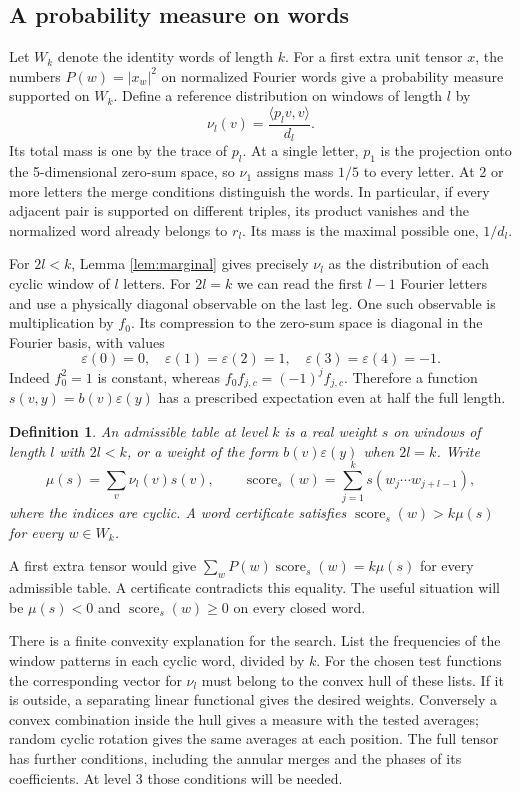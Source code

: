 \documentclass[11pt,a4paper]{amsart}
\newtheorem{definition}[theorem]{Definition}
\newcommand{\score}{\operatorname{score}}
\begin{document}
\subsection{A probability measure on words}
Let $W_k$ denote the identity words of length $k$. For a first extra unit tensor $x$, the numbers $P(w)=|x_w|^2$ on normalized Fourier words give a probability measure supported on $W_k$. Define a reference distribution on windows of length $l$ by
\[
 \nu_l(v)=\frac{\langle p_lv,v\rangle}{d_l}.
\]
Its total mass is one by the trace of $p_l$. At a single letter, $p_1$ is the projection onto the 5-dimensional zero-sum space, so $\nu_1$ assigns mass $1/5$ to every letter. At 2 or more letters the merge conditions distinguish the words. In particular, if every adjacent pair is supported on different triples, its product vanishes and the normalized word already belongs to $r_l$. Its mass is the maximal possible one, $1/d_l$.

For $2l<k$, Lemma \ref{lem:marginal} gives precisely $\nu_l$ as the distribution of each cyclic window of $l$ letters. For $2l=k$ we can read the first $l-1$ Fourier letters and use a physically diagonal observable on the last leg. One such observable is multiplication by $f_0$. Its compression to the zero-sum space is diagonal in the Fourier basis, with values
\[
 \varepsilon(0)=0,\quad \varepsilon(1)=\varepsilon(2)=1,\quad
 \varepsilon(3)=\varepsilon(4)=-1.
\]
Indeed $f_0^2=1$ is constant, whereas $f_0 f_{j,c}=(-1)^j f_{j,c}$. Therefore a function $s(v,y)=b(v)\varepsilon(y)$ has a prescribed expectation even at half the full length.

\begin{definition}
An admissible table at level $k$ is a real weight $s$ on windows of length $l$ with $2l<k$, or a weight of the form $b(v)\varepsilon(y)$ when $2l=k$. Write
\[
 \mu(s)=\sum_v\nu_l(v)s(v),\qquad
 \score_s(w)=\sum_{j=1}^k s(w_j\cdots w_{j+l-1}),
\]
where the indices are cyclic. A word certificate satisfies $\score_s(w)>k\mu(s)$ for every $w\in W_k$.
\end{definition}
A first extra tensor would give $\sum_w P(w)\score_s(w)=k\mu(s)$ for every admissible table. A certificate contradicts this equality. The useful situation will be $\mu(s)<0$ and $\score_s(w)\geq0$ on every closed word.

There is a finite convexity explanation for the search. List the frequencies of the window patterns in each cyclic word, divided by $k$. For the chosen test functions the corresponding vector for $\nu_l$ must belong to the convex hull of these lists. If it is outside, a separating linear functional gives the desired weights. Conversely a convex combination inside the hull gives a measure with the tested averages; random cyclic rotation gives the same averages at each position. The full tensor has further conditions, including the annular merges and the phases of its coefficients. At level 3 those conditions will be needed.
\end{document}
